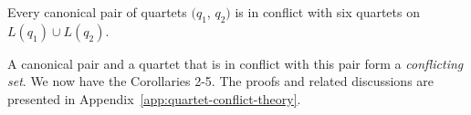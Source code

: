 \documentclass[runningheads]{llncs}
\newcommand{\add}[1]{{\color{blue} #1}}
\begin{document}

\begin{corollary}
\label{cor:six_conflict}
Every canonical pair of quartets $(q_1$, $q_2)$ is in conflict with six quartets on $L(q_1) \cup L(q_2)$.
\end{corollary}

\vspace{-10px}

A canonical pair and a quartet that is in conflict with this pair form a \textit{conflicting set}. We now have the Corollaries 2-5. %
The proofs and related discussions are presented in Appendix~\ref{app:quartet-conflict-theory}.

\end{document}
